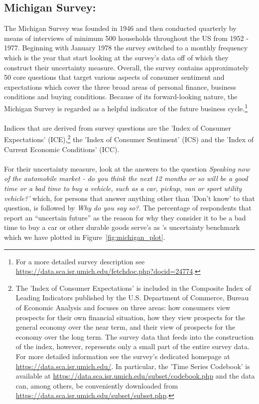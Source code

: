 \documentclass[a4paper,12pt,oneside,pointednumbers,bibtotoc,bigheadings,liststotoc]{scrbook}
\begin{document}
\subsection{Michigan Survey: \citet{leducandliu:16}}
\label{sec:michigansurvey}

The Michigan Survey was founded in 1946 and then conducted quarterly by means of interviews of minimum 500 households throughout the US from 1952 - 1977. Beginning with January 1978 the survey switched to a monthly frequency which is the year that \citet{leducandliu:16} start looking at the survey's data off of which they construct their uncertainty measure. Overall, the survey contains approximately 50 core questions that target various aspects of consumer sentiment and expectations which cover the three broad areas of personal finance, business conditions and buying conditions. Because of its forward-looking nature, the Michigan Survey is regarded as a helpful indicator of the future business cycle.\footnote{For a more detailed survey description see \url{https://data.sca.isr.umich.edu/fetchdoc.php?docid=24774}.}\\
\\
Indices that are derived from survey questions are the 'Index of Consumer Expectations' (ICE),\footnote{The 'Index of Consumer Expectations' is included in the Composite Index of Leading Indicators published by the U.S. Department of Commerce, Bureau of Economic Analysis and focuses on three areas: how consumers view prospects for their own financial situation, how they view prospects for the general economy over the near term, and their view of prospects for the economy over the long term. The survey data that feeds into the construction of the index, however, represents only a small part of the entire survey data. For more detailed information see the survey's dedicated homepage at \url{https://data.sca.isr.umich.edu/}. In particular, the 'Time Series Codebook' is available at \url{https://data.sca.isr.umich.edu/subset/codebook.php} and the data can, among others, be conveniently downloaded from \url{https://data.sca.isr.umich.edu/subset/subset.php}.} the 'Index of Consumer Sentiment' (ICS) and the 'Index of Current Economic Conditions' (ICC).\\
\\
For their uncertainty measure, \citet{leducandliu:16} look at the answers to the question \textit{Speaking now of the automobile market - do you think the next 12 months or so will be a good time or a bad time to buy a vehicle, such as a car, pickup, van or sport utility vehicle?'} which, for persons that answer anything other than 'Don't know' to that question, is followed by \textit{Why do you say so?}. The percentage of respondents that report an ``uncertain future'' as the reason for why they consider it to be a bad time to buy a car or other durable goods serve's as \citet{leducandliu:16}'s uncertainty benchmark which we have plotted in Figure~\ref{fig:michigan_plot}.
\end{document}
